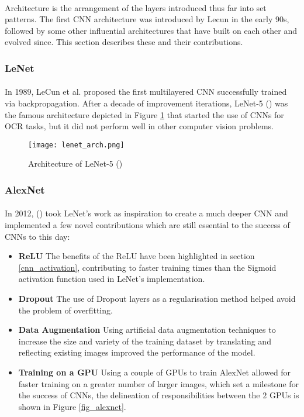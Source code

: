 \paragraph{}
Architecture is the arrangement of the layers introduced thus far into set patterns. The first \gls{CNN} architecture was introduced by Lecun in the early 90s, followed by some other influential architectures that have built on each other and evolved since. This section describes these and their contributions.

\subsubsection{LeNet}
\paragraph{}
In 1989, LeCun et al. proposed the first multilayered \gls{CNN} successfully trained via backpropagation. After a decade of improvement iterations, LeNet-5 (\cite{726791}) was the famous architecture depicted in Figure \ref{fig_lenet} that started the use of \gls{CNN}s for \gls{OCR} tasks, but it did not perform well in other computer vision problems.

    \begin{figure}[hbt!]
        \centering
        \texttt{[image: lenet\_arch.png]}
        \caption{Architecture of LeNet-5 (\cite{726791})}
        \label{fig_lenet}
    \end{figure}
    
\subsubsection{AlexNet}
\paragraph{}
In 2012, (\cite{10.5555/2999134.2999257}) took LeNet's work as inspiration to create a much deeper \gls{CNN} and implemented a few novel contributions which are still essential to the success of \gls{CNN}s to this day:
\begin{itemize}
    \item \textbf{ReLU} The benefits of the \gls{ReLU} have been highlighted in section \ref{cnn_activation}, contributing to faster training times than the Sigmoid activation function used in LeNet's implementation.
    \item \textbf{Dropout} The use of Dropout layers as a regularisation method helped avoid the problem of overfitting.
    \item \textbf{Data Augmentation} Using artificial data augmentation techniques to increase the size and variety of the training dataset by translating and reflecting existing images improved the performance of the model.
     \item \textbf{Training on a GPU} Using a couple of \gls{GPU}s to train AlexNet allowed for faster training on a greater number of larger images, which set a milestone for the success of \gls{CNN}s, the delineation of responsibilities between the $2$ \gls{GPU}s is shown in Figure \ref{fig_alexnet}.
\end{itemize}

